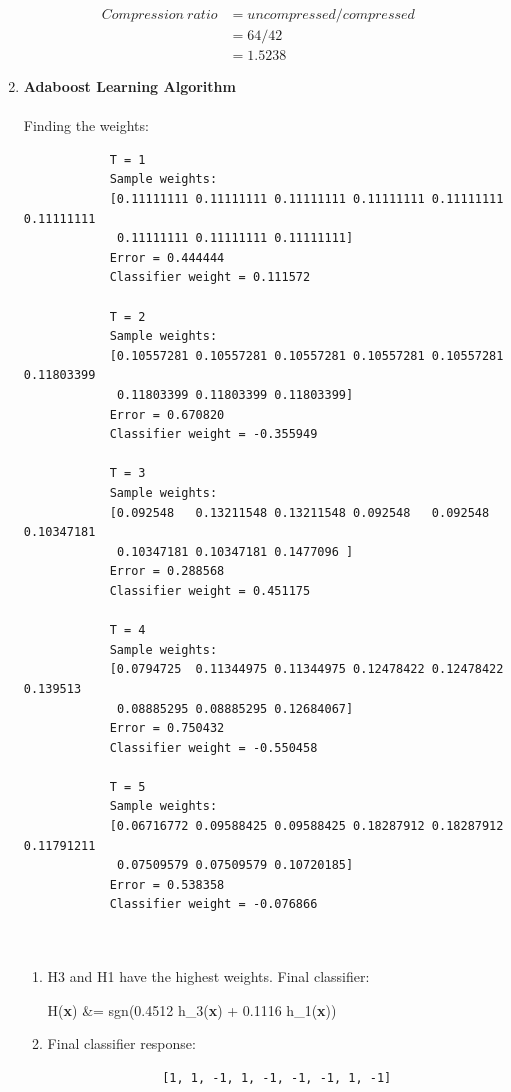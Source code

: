 \documentclass[12pt,a4paper]{article}
\begin{document}
\begin{enumerate}
			\begin{align*}
				Compression\ ratio &= uncompressed / compressed &\\
				&= 64/42 \\
				&= 1.5238 
			\end{align*}

		\pagebreak
		\item \textbf{Adaboost Learning Algorithm} \\ \\
		Finding the weights:
		\begin{verbatim}
			T = 1
			Sample weights:
			[0.11111111 0.11111111 0.11111111 0.11111111 0.11111111 0.11111111
			 0.11111111 0.11111111 0.11111111]
			Error = 0.444444
			Classifier weight = 0.111572
			
			T = 2
			Sample weights:
			[0.10557281 0.10557281 0.10557281 0.10557281 0.10557281 0.11803399
			 0.11803399 0.11803399 0.11803399]
			Error = 0.670820
			Classifier weight = -0.355949
			
			T = 3
			Sample weights:
			[0.092548   0.13211548 0.13211548 0.092548   0.092548   0.10347181
			 0.10347181 0.10347181 0.1477096 ]
			Error = 0.288568
			Classifier weight = 0.451175
			
			T = 4
			Sample weights:
			[0.0794725  0.11344975 0.11344975 0.12478422 0.12478422 0.139513
			 0.08885295 0.08885295 0.12684067]
			Error = 0.750432
			Classifier weight = -0.550458
			
			T = 5
			Sample weights:
			[0.06716772 0.09588425 0.09588425 0.18287912 0.18287912 0.11791211
			 0.07509579 0.07509579 0.10720185]
			Error = 0.538358
			Classifier weight = -0.076866

		
		\end{verbatim}

		\begin{enumerate}
			\item H3 and H1 have the highest weights. Final classifier:
			\begin{flalign*}
				H(\textbf{x}) &= sgn(0.4512 \cdot h_3(\textbf{x}) + 0.1116 \cdot h_1(\textbf{x}))
			\end{flalign*}

			\item Final classifier response:
			\begin{verbatim}
				[1, 1, -1, 1, -1, -1, -1, 1, -1]
			\end{verbatim}
		\end{enumerate}
	\end{enumerate}
\end{document}

